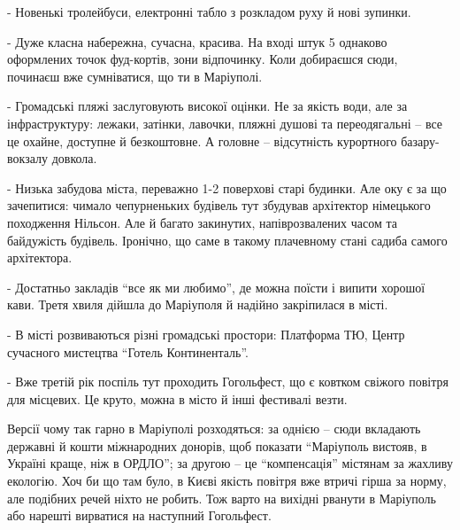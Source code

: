 - Новенькі тролейбуси, електронні табло з розкладом руху й нові зупинки. 

- Дуже класна набережна, сучасна, красива. На вході штук 5 однаково оформлених
точок фуд-кортів, зони відпочинку. Коли добираєшся сюди, починаєш вже
сумніватися, що ти в Маріуполі.

- Громадські пляжі заслуговують високої оцінки. Не за якість води, але за
інфраструктуру: лежаки, затінки, лавочки, пляжні душові та переодягальні – все
це охайне, доступне й безкоштовне. А головне – відсутність курортного
базару-вокзалу довкола.

- Низька забудова міста, переважно 1-2 поверхові старі будинки. Але оку є за що
зачепитися: чимало чепурненьких будівель тут збудував архітектор німецького
походження Нільсон. Але й багато закинутих, напіврозвалених часом та байдужість
будівель. Іронічно, що саме в такому плачевному стані садиба самого
архітектора.

- Достатньо закладів \enquote{все як ми любимо}, де можна поїсти і випити хорошої кави.
Третя хвиля дійшла до Маріуполя й надійно закріпилася в місті.

- В місті розвиваються різні громадські простори: Платформа ТЮ, Центр сучасного
мистецтва \enquote{Готель Континенталь}. 

- Вже третій рік поспіль тут проходить Гогольфест, що є ковтком свіжого повітря
для місцевих. Це круто, можна в місто й інші фестивалі везти.

Версії чому так гарно в Маріуполі розходяться: за однією – сюди вкладають
державні й кошти міжнародних донорів, щоб показати \enquote{Маріуполь вистояв, в
Україні краще, ніж в ОРДЛО}; за другою – це \enquote{компенсація} містянам за жахливу
екологію. Хоч би що там було, в Києві якість повітря вже втричі гірша за норму,
але подібних речей ніхто не робить. Тож варто на вихідні рванути в Маріуполь
або нарешті вирватися на наступний Гогольфест.

